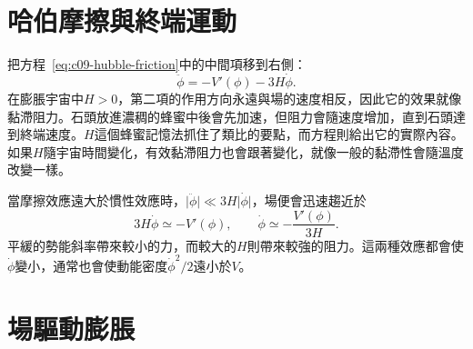 \section{哈伯摩擦與終端運動}

把方程~\eqref{eq:c09-hubble-friction}中的中間項移到右側：
\begin{equation}
\ddot\phi=-V'(\phi)-3H\dot\phi.
\end{equation}
在膨脹宇宙中\(H>0\)，第二項的作用方向永遠與場的速度相反，因此它的效果就像黏滯阻力。石頭放進濃稠的蜂蜜中後會先加速，但阻力會隨速度增加，直到石頭達到終端速度。\emph{\(H\)}這個蜂蜜記憶法抓住了類比的要點，而方程則給出它的實際內容。如果\(H\)隨宇宙時間變化，有效黏滯阻力也會跟著變化，就像一般的黏滯性會隨溫度改變一樣。

當摩擦效應遠大於慣性效應時，\(\lvert\ddot\phi\rvert\ll3H\lvert\dot\phi\rvert\)，場便會迅速趨近於
\begin{equation}
3H\dot\phi\simeq -V'(\phi),
\qquad
\dot\phi\simeq-\frac{V'(\phi)}{3H}.
\label{eq:c09-terminal}
\end{equation}
平緩的勢能斜率帶來較小的力，而較大的\(H\)則帶來較強的阻力。這兩種效應都會使\(\dot\phi\)變小，通常也會使動能密度\(\dot\phi^2/2\)遠小於\(V\)。

\begin{classroomqa}
\end{classroomqa}

\begin{classroomqa}
\end{classroomqa}

\section{場驅動膨脹}


